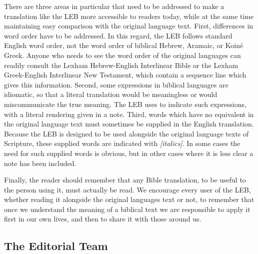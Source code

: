 There are three areas in particular that need to be addressed to make a translation like the LEB more accessible to readers 
today, while at the same time maintaining easy comparison with the original language text. First, differences in word order 
have to be addressed. In this regard, the LEB follows standard English word order, not the word order of biblical Hebrew, 
Aramaic, or Koiné Greek. Anyone who needs to see the word order of the original languages can readily consult the Lexham 
Hebrew-English Interlinear Bible or the Lexham Greek-English Interlinear New Testament, which contain a sequence line which 
gives this information. Second, some expressions in biblical languages are idiomatic, so that a literal translation would 
be meaningless or would miscommunicate the true meaning. The LEB uses  to indicate such expressions, 
with a literal rendering given in a note. Third, words which have no equivalent in the original language text must sometimes 
be supplied in the English translation. Because the LEB is designed to be used alongside the original language texts of 
Scripture, these supplied words are indicated with \textit{[italics]}. In some cases the need for such supplied words is obvious, 
but in other cases where it is less clear a note has been included.\par
Finally, the reader should remember that any Bible translation, to be useful to the person using it, must actually be read. 
We encourage every user of the LEB, whether reading it alongside the original languages text or not, to remember that once 
we understand the meaning of a biblical text we are responsible to apply it first in our own lives, and then to share it 
with those around us.\par

\subsection*{The Editorial Team}


